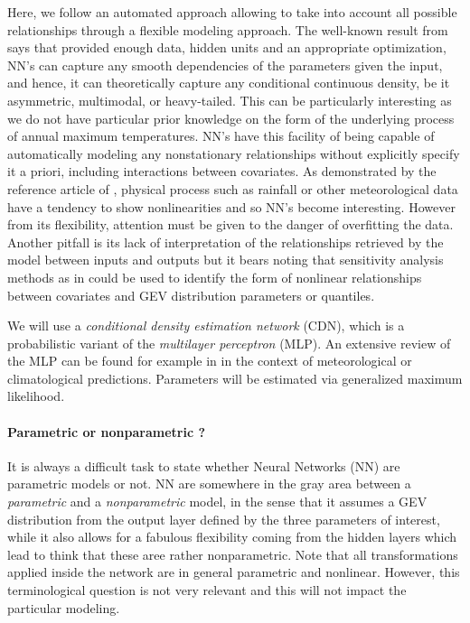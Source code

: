 Here, we follow an automated approach allowing to take into account all possible relationships through a flexible modeling approach.
The well-known result from \cite{Hornik_1989} says that provided enough data, hidden units and an appropriate optimization, NN's can capture any smooth dependencies of the parameters given the input, and hence, it can theoretically capture any conditional continuous density, be it asymmetric, multimodal, or heavy-tailed. This can be particularly interesting as we do not have particular prior knowledge on the form of the underlying process of annual maximum temperatures. 
NN's have this facility of being capable of automatically modeling any nonstationary relationships without explicitly specify it a priori, including interactions between covariates.  As demonstrated by the reference article of \citet{cannon_flexible_2010}, physical process such as rainfall or other meteorological data have a tendency to show nonlinearities and so NN's become interesting. However from its flexibility, attention must be given to the danger of overfitting the data.  Another pitfall is its lack of interpretation of the relationships retrieved by the model between inputs and outputs but it bears noting that sensitivity analysis methods as in \citet{cannon_graph_2002} could be used to identify the form of nonlinear relationships between covariates and GEV distribution parameters or quantiles.


We will use a \emph{conditional density estimation network} (CDN), which is a probabilistic variant of the \emph{multilayer perceptron} (MLP). 
An extensive review of the MLP can be found for example in \citet{Hsieh_Tang_1998} in the context of meteorological or climatological predictions. Parameters will be estimated via generalized maximum likelihood. 



\paragraph*{Parametric or nonparametric ?}
It is always a difficult task to state whether Neural Networks (NN) are parametric models or not. NN  are somewhere in the gray area between a \emph{parametric} and a \emph{nonparametric} model, in the sense that it assumes a GEV distribution from the output layer defined by the three parameters of interest, while it also allows for a fabulous flexibility coming from the hidden layers which lead to think that these aree rather nonparametric. 
Note that all transformations applied inside the network are in general parametric and nonlinear.
However, this terminological question is not very relevant and this will not impact the particular modeling.

